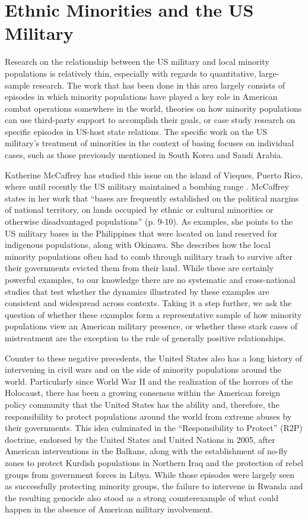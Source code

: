 
\section*{Ethnic Minorities and the US Military}

Research on the relationship between the US military and local minority populations is relatively thin, especially with regards to quantitative, large-sample research. The work that has been done in this area largely consists of episodes in which minority populations have played a key role in American combat operations somewhere in the world, theories on how minority populations can use third-party support to accomplish their goals, or case study research on specific episodes in US-host state relations. The specific work on the US military's treatment of minorities in the context of basing focuses on individual cases, such as those previously mentioned in South Korea and Saudi Arabia. 

Katherine McCaffrey has studied this issue on the island of Vieques, Puerto Rico, where until recently the US military maintained a bombing range \cite{Mccaffrey2002}. McCaffrey states in her work that ``bases are frequently established on the political margins of national territory, on lands occupied by ethnic or cultural minorities or otherwise disadvantaged populations'' (p. 9-10). As examples, she points to the US military bases in the Philippines that were located on land reserved for indigenous populations, along with Okinawa. She describes how the local minority populations often had to comb through military trash to survive after their governments evicted them from their land. While these are certainly powerful examples, to our knowledge there are no systematic and cross-national studies that test whether the dynamics illustrated by these examples are consistent and widespread across contexts. Taking it a step further, we ask the question of whether these examples form a representative sample of how minority populations view an American military presence, or whether these stark cases of mistreatment are the exception to the rule of generally positive relationships. 

Counter to these negative precedents, the United States also has a long history of intervening in civil wars and on the side of minority populations around the world. Particularly since World War II and the realization of the horrors of the Holocaust, there has been a growing consensus within the American foreign policy community that the United States has the ability and, therefore, the responsibility to protect populations around the world from extreme abuses by their governments. This idea culminated in the ``Responsibility to Protect'' (R2P) doctrine, endorsed by the United States and United Nations in 2005, after American interventions in the Balkans, along with the establishment of no-fly zones to protect Kurdish populations in Northern Iraq and the protection of rebel groups from government forces in Libya. While those episodes were largely seen as successfully protecting minority groups, the failure to intervene in Rwanda and the resulting genocide also stood as a strong counterexample of what could happen in the absence of American military involvement. 

